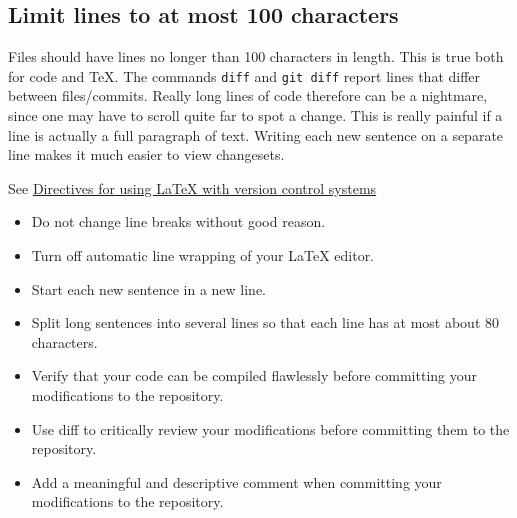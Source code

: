 \subsection{Limit lines to at most 100 characters}

Files should have lines no longer than 100 characters in length.
This is true both for code and \TeX.
The commands \texttt{diff} and \texttt{git diff} report lines that differ between files/commits.
Really long lines of code therefore can be a nightmare, since one may have to scroll quite far to spot a change.
This is really painful if a line is actually a full paragraph of text.
Writing each new sentence on a separate line makes it much easier to view changesets.

See \href{https://en.wikibooks.org/wiki/LaTeX/Collaborative_Writing_of_LaTeX_Documents\#Subversion_really_makes_the_difference}{Directives for using LaTeX with version control systems}
\begin{itemize}
\item Do not change line breaks without good reason.
\item Turn off automatic line wrapping of your LaTeX editor.
\item Start each new sentence in a new line.
\item Split long sentences into several lines so that each line has at most about 80 characters.
\item Verify that your code can be compiled flawlessly before committing your modifications to the repository.
\item Use diff to critically review your modifications before committing them to the repository.
\item Add a meaningful and descriptive comment when committing your modifications to the repository.
\end{itemize}
